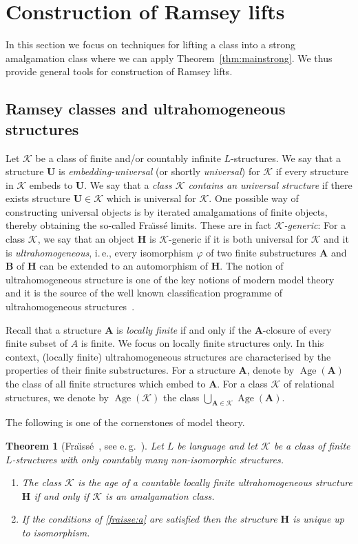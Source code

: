 \documentclass{elsarticle}
\newcommand{\ie}{i.\,e.}
\newcommand{\eg}{e.\,g.}
\def\Age{\mathop{\mathrm{Age}}\nolimits}
\def\str#1{\mathbf {#1}}
\def\K{{\mathcal K}}
\def\Fraisse{Fra\"{\i}ss\' e}
\theoremstyle{plain}
\newtheorem{theorem}{Theorem}[section]
\theoremstyle{definition}
\theoremstyle{remark}
\begin{document}
\section{Construction of Ramsey lifts}
\label{sec:lifts}
In this section we focus on techniques for
lifting a class into a strong amalgamation class where we can apply Theorem~\ref{thm:mainstrong}.
We thus provide general tools for construction of Ramsey lifts.

\subsection{Ramsey classes and ultrahomogeneous structures}
\label{sec:fraisse}
Let $\K$ be a class of finite and/or countably infinite $L$-structures.  We say that a structure $\str{U}$ is \emph{embedding-universal} (or shortly \emph{universal}) for $\K$
if every structure in $\K$ embeds to $\str{U}$. We say that a \emph{class $\K$ contains an universal structure} if there exists structure $\str{U}\in \K$ which
is universal for $\K$.
One possible way of constructing universal objects is by iterated
amalgamations of finite objects, thereby obtaining the so-called \Fraisse{} limits. These are in fact \emph{$\K$-generic}: For a class $\K$, we say that an object $\str{H}$ is
$\K$-generic if it is both universal for $\K$ and it is \emph{ultrahomogeneous}, \ie{}, every isomorphism
$\varphi$ of two finite substructures $\str{A}$ and $\str{B}$ of
$\str{H}$ can be extended to an automorphism of $\str{H}$.  The notion of
ultrahomogeneous structure is one of the key notions of modern model theory and
it is the source of the well known classification programme of ultrahomogeneous structures~\cite{Lachlan1980,Cherlin1998,Cherlin2013}.

Recall that a structure $\str{A}$ is \emph{locally finite} if and only if the
$\str{A}$-closure of every finite subset of $A$ is finite. We focus on locally finite structures only. In
this context, (locally finite) ultrahomogeneous structures are characterised by the properties
of their finite substructures.  For a structure $\str{A}$, denote by
$\Age(\str{A})$ the class of all finite structures which embed to $\str{A}$.
For a class $\K$ of relational structures, we denote by $\Age(\K)$ the class
$\bigcup_{\str{A}\in \K} \Age(\str{A})$.

The following is one of the cornerstones of model theory.

\begin{theorem}[\Fraisse{}~\cite{Fraisse1986}, see \eg{}\ \cite{Hodges1993}]
\label{fraissethm}
Let $L$ be language and let $\K$ be a class of finite $L$-structures with only countably many non-isomorphic structures.

\begin{enumerate}[label=$(\alph*)$]
\item\label{fraisse:a} The class $\K$ is the age of a countable
locally finite ultrahomogeneous structure $\str{H}$ if and only if $\K$ is an amalgamation
class.
\item If the conditions of \ref{fraisse:a} are satisfied then the structure $\str{H}$ is
unique up to isomorphism. 
\end{enumerate}
\end{theorem}
\end{document}
